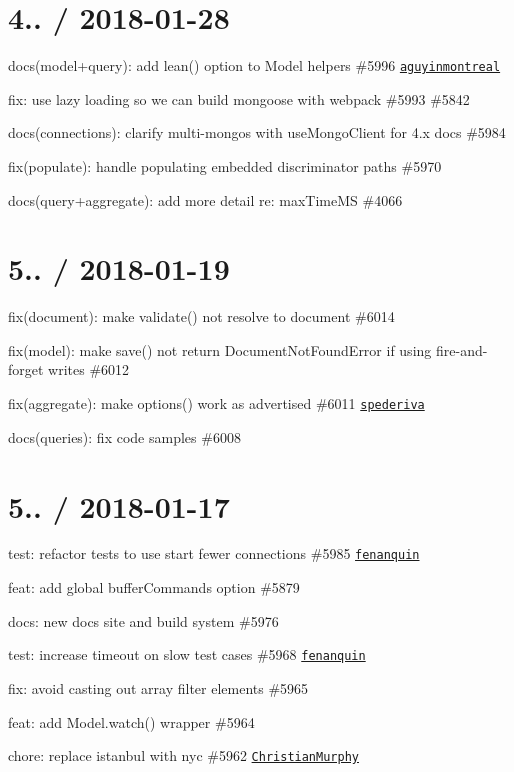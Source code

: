 \section*{4.. / 2018-\/01-\/28 }


\begin{DoxyItemize}
\item docs(model+query)\+: add lean() option to Model helpers \#5996 \href{https://github.com/aguyinmontreal}{\tt aguyinmontreal}
\item fix\+: use lazy loading so we can build mongoose with webpack \#5993 \#5842
\item docs(connections)\+: clarify multi-\/mongos with use\+Mongo\+Client for 4.\+x docs \#5984
\item fix(populate)\+: handle populating embedded discriminator paths \#5970
\item docs(query+aggregate)\+: add more detail re\+: max\+Time\+MS \#4066
\end{DoxyItemize}

\section*{5.. / 2018-\/01-\/19 }


\begin{DoxyItemize}
\item fix(document)\+: make validate() not resolve to document \#6014
\item fix(model)\+: make save() not return Document\+Not\+Found\+Error if using fire-\/and-\/forget writes \#6012
\item fix(aggregate)\+: make options() work as advertised \#6011 \href{https://github.com/spederiva}{\tt spederiva}
\item docs(queries)\+: fix code samples \#6008
\end{DoxyItemize}

\section*{5.. / 2018-\/01-\/17 }


\begin{DoxyItemize}
\item test\+: refactor tests to use start fewer connections \#5985 \href{https://github.com/fenanquin}{\tt fenanquin}
\item feat\+: add global buffer\+Commands option \#5879
\item docs\+: new docs site and build system \#5976
\item test\+: increase timeout on slow test cases \#5968 \href{https://github.com/fenanquin}{\tt fenanquin}
\item fix\+: avoid casting out array filter elements \#5965
\item feat\+: add Model.\+watch() wrapper \#5964
\item chore\+: replace istanbul with nyc \#5962 \href{https://github.com/ChristianMurphy}{\tt Christian\+Murphy}
\end{DoxyItemize}


